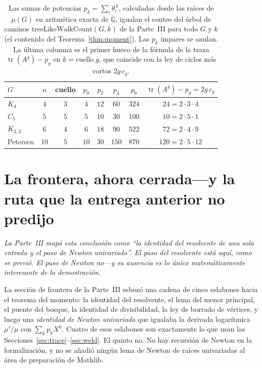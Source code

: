 \documentclass[11pt]{article}
\DeclareMathOperator{\tr}{tr}
\begin{document}
\begin{table}[t]
\centering\small
\caption{Las sumas de potencias $p_k=\sum_i\theta_i^{\,k}$, calculadas desde las ra\'ices de $\mu(G)$
en aritm\'etica exacta de $\overline{\mathbb{Q}}$, igualan el conteo del \'arbol de caminos
$\mathrm{treeLikeWalkCount}(G,k)$ de la Parte~III para todo $G$ y $k$ (el contenido del
Teorema~\ref{thm:moment}). Las $p_k$ impares se anulan. La \'ultima columna es el primer hueco de la
f\'ormula de la traza $\tr(A^{g})-p_{g}$ en $k=\mathrm{cuello}\;g$, que coincide con la ley de ciclos
m\'as cortos $2g\,c_g$.}
\label{tab:verify}
\begin{tabular}{@{}lccccccc@{}}
\toprule
\rowcolor{ggteal}
{\color{white}\textbf{$G$}} & {\color{white}$n$} & {\color{white}cuello} &
{\color{white}$p_0$} & {\color{white}$p_2$} & {\color{white}$p_4$} & {\color{white}$p_6$} &
{\color{white}$\tr(A^{g})-p_{g}=2g\,c_g$}\\
\midrule
$K_4$        & $4$  & $3$ & $4$  & $12$ & $60$  & $324$  & $24=2\cdot3\cdot4$\\
$C_5$        & $5$  & $5$ & $5$  & $10$ & $30$  & $100$  & $10=2\cdot5\cdot1$\\
$K_{3,3}$    & $6$  & $4$ & $6$  & $18$ & $90$  & $522$  & $72=2\cdot4\cdot9$\\
Petersen     & $10$ & $5$ & $10$ & $30$ & $150$ & $870$  & $120=2\cdot5\cdot12$\\
\bottomrule
\end{tabular}
\end{table}

\section{La frontera, ahora cerrada---y la ruta que la entrega anterior no predijo}
\label{sec:boundary}

\emph{La Parte~III map\'o esta conclusi\'on como ``la identidad del resolvente de una sola entrada y el
paso de Newton univariado''. El paso del resolvente est\'a aqu\'i, como se previ\'o. El paso de Newton
no---y su ausencia es lo \'unico matem\'aticamente interesante de la demostraci\'on.}

La secci\'on de frontera de la Parte~III esboz\'o una cadena de cinco eslabones hacia el teorema del
momento: la identidad del resolvente, el lema del menor principal, el puente del bosque, la identidad
de divisibilidad, la ley de borrado de v\'ertices, y luego una \emph{identidad de Newton univariada}
que igualaba la derivada logar\'itmica $\mu'/\mu$ con $\sum_k p_kX^k$. Cuatro de esos eslabones son
exactamente lo que usan las Secciones~\ref{sec:trace}--\ref{sec:weld}. El quinto no. No hay recursi\'on
de Newton en la formalizaci\'on, y no se a\~nadi\'o ning\'un lema de Newton de ra\'ices univariadas al
\'area de preparaci\'on de Mathlib.
\end{document}
